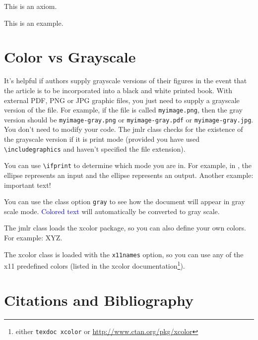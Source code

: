 \documentclass[pmlr]{jmlr}%
\begin{document}
\begin{axiom}\label{ax:sample}
This is an axiom.
\end{axiom}

\begin{example}[An Example]\label{ex:sample}
This is an example.
\end{example}

\section{Color vs Grayscale}
\label{sec:color}

It's helpful if authors supply grayscale versions of their
figures in the event that the article is to be incorporated into
a black and white printed book. With external PDF, PNG or JPG
graphic files, you just need to supply a grayscale version of the
file. For example, if the file is called \texttt{myimage.png},
then the gray version should be \texttt{myimage-gray.png} or
\texttt{myimage-gray.pdf} or \texttt{myimage-gray.jpg}. You don't
need to modify your code. The \textsf{jmlr} class checks for
the existence of the grayscale version if it is print mode 
(provided you have used \verb|\includegraphics| and haven't
specified the file extension).

You can use \verb|\ifprint| to determine which mode you are in.
For example, in , the 
 ellipse represents an input and the
 ellipse represents an output.
Another example: {\ifprint{\bfseries}{\color{red}}important text!}

You can use the class option \texttt{gray} to see how the
document will appear in gray scale mode. \textcolor{blue}{Colored
text} will automatically be converted to gray scale.

The \textsf{jmlr} class loads the \textsf{xcolor}
package, so you can also define your own colors. For example:
\ifprint
  {}%
  {}%
\textcolor{myred}{XYZ}.

The \textsf{xcolor} class is loaded with the \texttt{x11names}
option, so you can use any of the x11 predefined colors (listed
in the \textsf{xcolor} documentation\footnote{either 
\texttt{texdoc xcolor} or \url{http://www.ctan.org/pkg/xcolor}}).

\section{Citations and Bibliography}
\label{sec:cite}
\end{document}
